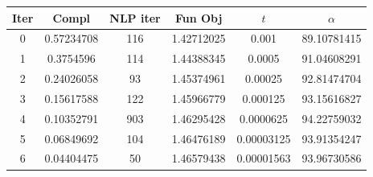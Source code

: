 \begin{tabular}{c c c c c c}
\toprule
Iter & Compl & NLP iter & Fun Obj & $t$ & $\alpha$ \\
\midrule
0 & 0.57234708 & 116 & 1.42712025 & 0.001 & 89.10781415 \\
1 & 0.3754596 & 114 & 1.44388345 & 0.0005 & 91.04608291 \\
2 & 0.24026058 & 93 & 1.45374961 & 0.00025 & 92.81474704 \\
3 & 0.15617588 & 122 & 1.45966779 & 0.000125 & 93.15616827 \\
4 & 0.10352791 & 903 & 1.46295428 & 0.0000625 & 94.22759032 \\
5 & 0.06849692 & 104 & 1.46476189 & 0.00003125 & 93.91354247 \\
6 & 0.04404475 & 50 & 1.46579438 & 0.00001563 & 93.96730586 \\
\bottomrule
\end{tabular}